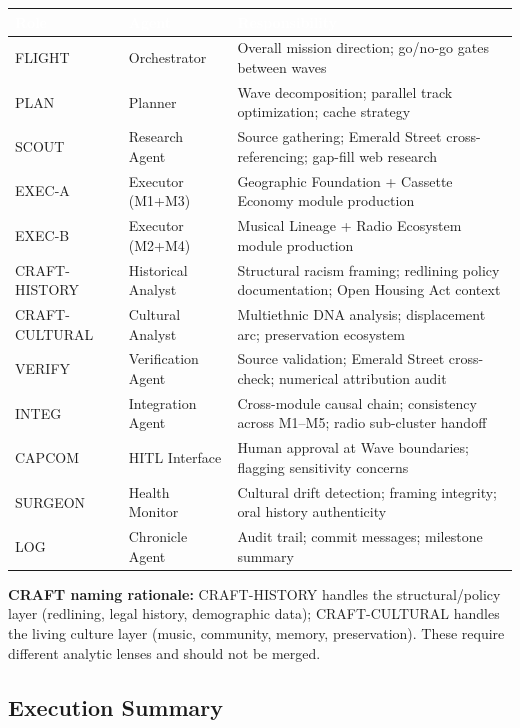 \documentclass[11pt,letterpaper]{article}
\newcommand{\tableheader}[1]{\textbf{\sffamily\textcolor{white}{#1}}}
\begin{document}
\begin{center}
\begin{tabularx}{\textwidth}{L{2cm}L{3cm}X}
\toprule
{}
\tableheader{Role} & \tableheader{Agent} & \tableheader{Responsibility} \\
\midrule
FLIGHT & Orchestrator & Overall mission direction; go/no-go gates between waves \\
PLAN & Planner & Wave decomposition; parallel track optimization; cache strategy \\
SCOUT & Research Agent & Source gathering; Emerald Street cross-referencing; gap-fill web research \\
EXEC-A & Executor (M1+M3) & Geographic Foundation + Cassette Economy module production \\
EXEC-B & Executor (M2+M4) & Musical Lineage + Radio Ecosystem module production \\
CRAFT-HISTORY & Historical Analyst & Structural racism framing; redlining policy documentation; Open Housing Act context \\
CRAFT-CULTURAL & Cultural Analyst & Multiethnic DNA analysis; displacement arc; preservation ecosystem \\
VERIFY & Verification Agent & Source validation; Emerald Street cross-check; numerical attribution audit \\
INTEG & Integration Agent & Cross-module causal chain; consistency across M1--M5; radio sub-cluster handoff \\
CAPCOM & HITL Interface & Human approval at Wave boundaries; flagging sensitivity concerns \\
SURGEON & Health Monitor & Cultural drift detection; framing integrity; oral history authenticity \\
LOG & Chronicle Agent & Audit trail; commit messages; milestone summary \\
\bottomrule
\end{tabularx}
\end{center}

\textbf{CRAFT naming rationale:} CRAFT-HISTORY handles the structural/policy layer (redlining, legal history, demographic data); CRAFT-CULTURAL handles the living culture layer (music, community, memory, preservation). These require different analytic lenses and should not be merged.

\subsection{Execution Summary}
\end{document}
